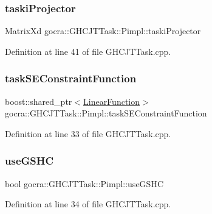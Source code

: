 \subsubsection{\texorpdfstring{taski\+Projector}{taskiProjector}}
{\footnotesize\ttfamily Matrix\+Xd gocra\+::\+G\+H\+C\+J\+T\+Task\+::\+Pimpl\+::taski\+Projector}



Definition at line 41 of file G\+H\+C\+J\+T\+Task.\+cpp.

\hypertarget{structgocra_1_1GHCJTTask_1_1Pimpl_ab1b71cfa2f203377834f529d2c0e98c3}{}\label{structgocra_1_1GHCJTTask_1_1Pimpl_ab1b71cfa2f203377834f529d2c0e98c3} 
\subsubsection{\texorpdfstring{task\+S\+E\+Constraint\+Function}{taskSEConstraintFunction}}
{\footnotesize\ttfamily boost\+::shared\+\_\+ptr$<$\hyperlink{classocra_1_1LinearFunction}{Linear\+Function}$>$ gocra\+::\+G\+H\+C\+J\+T\+Task\+::\+Pimpl\+::task\+S\+E\+Constraint\+Function}



Definition at line 33 of file G\+H\+C\+J\+T\+Task.\+cpp.

\hypertarget{structgocra_1_1GHCJTTask_1_1Pimpl_a0beb46ac94216a28202956bf87fc1d2d}{}\label{structgocra_1_1GHCJTTask_1_1Pimpl_a0beb46ac94216a28202956bf87fc1d2d} 
\subsubsection{\texorpdfstring{use\+G\+S\+HC}{useGSHC}}
{\footnotesize\ttfamily bool gocra\+::\+G\+H\+C\+J\+T\+Task\+::\+Pimpl\+::use\+G\+S\+HC}



Definition at line 34 of file G\+H\+C\+J\+T\+Task.\+cpp.

\hypertarget{structgocra_1_1GHCJTTask_1_1Pimpl_a5bf2a2e00bd9406bb6a993b616a47d07}{}\label{structgocra_1_1GHCJTTask_1_1Pimpl_a5bf2a2e00bd9406bb6a993b616a47d07} 
